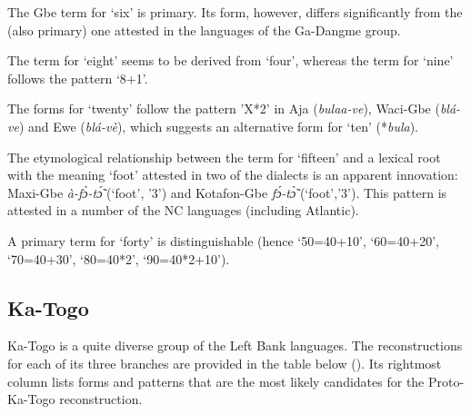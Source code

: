The Gbe term for ‘six’ is primary. Its form, however, differs significantly from the (also primary) one attested in the languages of the Ga-Dangme group.

The term for ‘eight’ seems to be derived from ‘four’, whereas the term for ‘nine’ follows the pattern ‘8+1’.

The forms for ‘twenty’ follow the pattern ’X*2’ in Aja (\textit{bulaa-ve}), Waci-Gbe (\textit{blá-ve}) and Ewe (\textit{blá-vè}), which suggests an alternative form for ‘ten’ (*\textit{bula}).

The etymological relationship between the term for ‘fifteen’ and a lexical root with the meaning ‘foot’ attested in two of the dialects is an apparent innovation: Maxi-Gbe \textit{à-f{\`{ɔ}}-t{\'{\~ɔ}}} (‘foot’, ’3’) and Kotafon-Gbe \textit{f{\'{ɔ}}-t{\`{\~ɔ}}} (‘foot’,’3’). This pattern is attested in a number of the NC languages (including Atlantic). 

A primary term for ‘forty’ is distinguishable (hence ‘50=40+10’, ‘60=40+20’, ‘70=40+30’, ‘80=40*2’, ‘90=40*2+10’).


\subsection{Ka-Togo}%
\largerpage
Ka-Togo is a quite diverse group of the Left Bank languages. The reconstructions for each of its three branches are provided in the table below (). Its rightmost column lists forms and patterns that are the most likely candidates for the Proto-Ka-Togo reconstruction.

